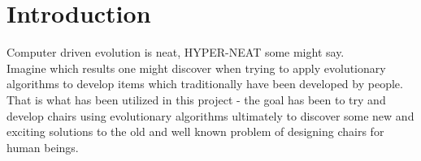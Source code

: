 \section{Introduction}
Computer driven evolution is neat, HYPER-NEAT some might say.\\

Imagine which results one might discover when trying to apply evolutionary algorithms to develop items which traditionally have been developed by people.\\

That is what has been utilized in this project - the goal has been to try and develop chairs using evolutionary algorithms ultimately to discover some new and exciting solutions to the old and well known problem of designing chairs for human beings.